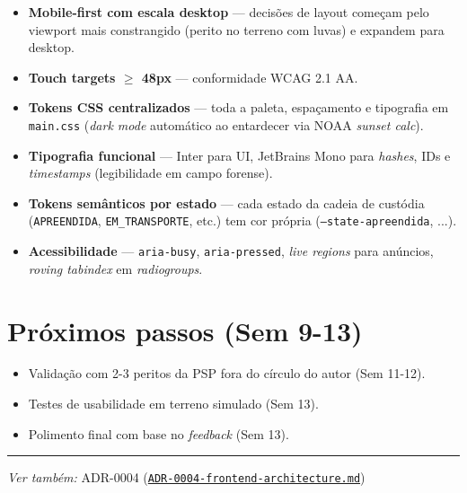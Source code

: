 \documentclass[a4paper,11pt]{article}
\begin{document}
\begin{itemize}[leftmargin=*]
    \item \textbf{Mobile-first com escala desktop} --- decisões de layout começam pelo
        viewport mais constrangido (perito no terreno com luvas) e expandem para desktop.
    \item \textbf{Touch targets $\geq$ 48px} --- conformidade WCAG 2.1 AA.
    \item \textbf{Tokens CSS centralizados} --- toda a paleta, espaçamento e tipografia
        em \texttt{main.css} (\textit{dark mode} automático ao entardecer via NOAA \textit{sunset calc}).
    \item \textbf{Tipografia funcional} --- Inter para UI, JetBrains Mono para
        \textit{hashes}, IDs e \textit{timestamps} (legibilidade em campo forense).
    \item \textbf{Tokens semânticos por estado} --- cada estado da cadeia de custódia
        (\texttt{APREENDIDA}, \texttt{EM\_TRANSPORTE}, etc.) tem cor própria
        (\texttt{--state-apreendida}, ...).
    \item \textbf{Acessibilidade} --- \texttt{aria-busy}, \texttt{aria-pressed},
        \textit{live regions} para anúncios, \textit{roving tabindex} em \textit{radiogroups}.
\end{itemize}

\section{Próximos passos (Sem 9-13)}

\begin{itemize}[leftmargin=*]
    \item Validação com 2-3 peritos da PSP fora do círculo do autor (Sem 11-12).
    \item Testes de usabilidade em terreno simulado (Sem 13).
    \item Polimento final com base no \textit{feedback} (Sem 13).
\end{itemize}

\vspace{1cm}
\hrule
\vspace{0.5em}
\begin{center}
\small\textit{Ver também:} ADR-0004 (\href{../architecture/adr/ADR-0004-frontend-architecture.md}{\texttt{ADR-0004-frontend-architecture.md}})
\end{center}
\end{document}
